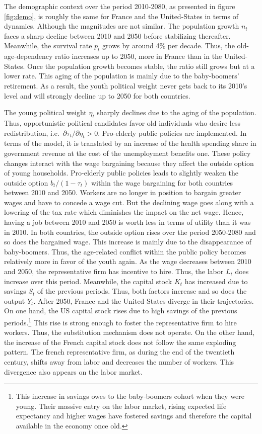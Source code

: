 \documentclass[
]{article}
\begin{document}
The demographic context over the period 2010-2080, as presented in figure \ref{fig:demo}, is roughly the same for France and the United-States in terms of dynamics. Although the magnitudes are not similar. The population growth \(n_t\) faces a sharp decline between 2010 and 2050 before stabilizing thereafter. Meanwhile, the survival rate \(p_t\) grows by around 4\% per decade. Thus, the old-age-dependency ratio increases up to 2050, more in France than in the United-States. Once the population growth becomes stable, the ratio still grows but at a lower rate. This aging of the population is mainly due to the baby-boomers' retirement. As a result, the youth political weight never gets back to its 2010's level and will strongly decline up to 2050 for both countries.

The young political weight \(\eta_t\) sharply declines due to the aging of the population. Thus, opportunistic political candidates favor old individuals who desire less redistribution, i.e.~\(\partial\tau_t / \partial \eta_t > 0\). Pro-elderly public policies are implemented. In terms of the model, it is translated by an increase of the health spending share in government revenue at the cost of the unemployment benefits one.
These policy changes interact with the wage bargaining because they affect the outside option of young households.
Pro-elderly public policies leads to slightly weaken the outside option \(b_t/(1-\tau_t)\) within the wage bargaining for both countries between 2010 and 2050. Workers are no longer in position to bargain greater wages and have to concede a wage cut. But the declining wage goes along with a lowering of the tax rate which diminishes the impact on the net wage. Hence, having a job between 2010 and 2050 is worth less in terms of utility than it was in 2010. In both countries, the outside option rises over the period 2050-2080 and so does the bargained wage. This increase is mainly due to the disappearance of baby-boomers. Thus, the age-related conflict within the public policy becomes relatively more in favor of the youth again.
As the wage decreases between 2010 and 2050, the representative firm has incentive to hire. Thus, the labor \(L_t\) does increase over this period. Meanwhile, the capital stock \(K_t\) has increased due to savings \(S_t\) of the previous periods. Thus, both factors increase and so does the output \(Y_t\). After 2050, France and the United-States diverge in their trajectories. On one hand, the US capital stock rises due to high savings of the previous periods.\footnote{This increase in savings owes to the baby-boomers cohort when they were young. Their massive entry on the labor market, rising expected life expectancy and higher wages have fostered savings and therefore the capital available in the economy once old.} This rise is strong enough to foster the representative firm to hire workers. Thus, the substitution mechanism does not operate. On the other hand, the increase of the French capital stock does not follow the same exploding pattern. The french representative firm, as during the end of the twentieth century, shifts away from labor and decreases the number of workers. This divergence also appears on the labor market.
\end{document}

